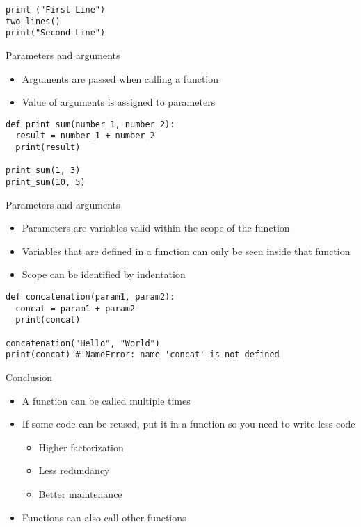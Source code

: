 \documentclass[10pt, a4paper]{beamer} %
\begin{document}
\begin{frame}
\begin{examples}
\begin{lstlisting}
print ("First Line")
two_lines()
print("Second Line")
  \end{lstlisting}
	\end{examples}

	\framebreak
	\begin{block}{Parameters and arguments}
		\begin{itemize}
			\item Arguments are passed when calling a function
			\item Value of arguments is assigned to parameters
		\end{itemize}
		\begin{lstlisting}
def print_sum(number_1, number_2):
  result = number_1 + number_2
  print(result)

print_sum(1, 3)
print_sum(10, 5)
  \end{lstlisting}
	\end{block}
	\begin{block}{Parameters and arguments}
		\framebreak
		\begin{itemize}
			\item Parameters are variables valid within the scope of the function
			\item Variables that are defined in a function can only be seen inside that function
			\item Scope can be identified by indentation
		\end{itemize}
		\begin{lstlisting}
def concatenation(param1, param2):
  concat = param1 + param2
  print(concat)

concatenation("Hello", "World")
print(concat) # NameError: name 'concat' is not defined
  \end{lstlisting}
	\end{block}
	\begin{block}{Conclusion}
		\begin{itemize}
			\item A function can be called multiple times
			\item If some code can be reused, put it in a function so you need to write less code
			      \begin{itemize}
				      \item Higher factorization
				      \item Less redundancy
				      \item Better maintenance
			      \end{itemize}
			\item Functions can also call other functions
		\end{itemize}
	\end{block}
\end{frame}
\end{document}
